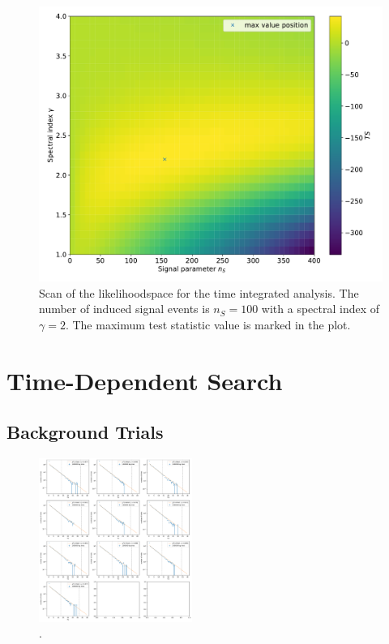 \begin{figure}
    \centering
    \includegraphics[width=\linewidth]{Plots/05_csky/llh_scan_time_int.pdf}
    \caption{Scan of the likelihoodspace for the time integrated analysis. The number of induced signal events is $n_S = \num{100}$ with a spectral index of $\gamma = 2$. The maximum test statistic value is marked in the plot.}
    \label{fig:llh_scan_time_int}
\end{figure}

\chapter{Time-Dependent Search}

\section{Background Trials}

\begin{figure}
    \centering
    \includegraphics[width=5cm]{Plots/05_csky/9_years_gfu_gold_time_dep_bg_t0.pdf}
    \caption{.}
\end{figure}

